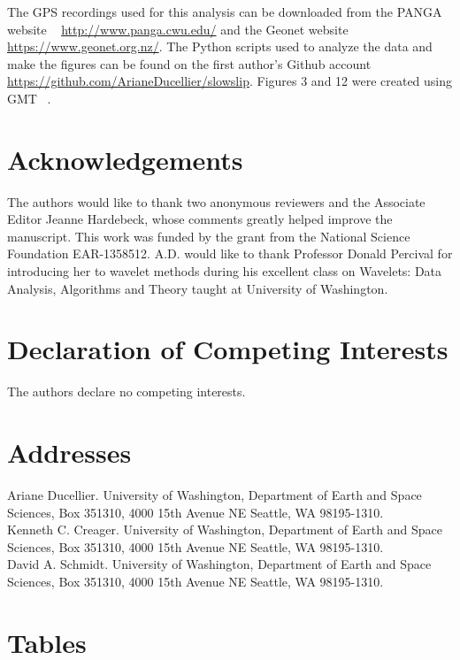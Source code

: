 \documentclass{article}
\begin{document}
The GPS recordings used for this analysis can be downloaded from the PANGA website ~\citep{PANGA} \url{http://www.panga.cwu.edu/} and the Geonet website \url{https://www.geonet.org.nz/}. The Python scripts used to analyze the data and make the figures can be found on the first author's Github account \url{https://github.com/ArianeDucellier/slowslip}. Figures 3 and 12 were created using GMT ~\citep{WES_1991}.

\section*{Acknowledgements}

The authors would like to thank two anonymous reviewers and the Associate Editor Jeanne Hardebeck, whose comments greatly helped improve the manuscript. This work was funded by the grant from the National Science Foundation EAR-1358512. A.D. would like to thank Professor Donald Percival for introducing her to wavelet methods during his excellent class on Wavelets: Data Analysis, Algorithms and Theory taught at University of Washington.   

\section*{Declaration of Competing Interests}

The authors declare no competing interests.




\newpage

\section*{Addresses}

Ariane Ducellier. University of Washington, Department of Earth and Space Sciences, Box 351310, 4000 15th Avenue NE Seattle, WA 98195-1310. \\

Kenneth C. Creager. University of Washington, Department of Earth and Space Sciences, Box 351310, 4000 15th Avenue NE Seattle, WA 98195-1310. \\

David A. Schmidt. University of Washington, Department of Earth and Space Sciences, Box 351310, 4000 15th Avenue NE Seattle, WA 98195-1310.

\newpage

\section*{Tables}
\end{document}
